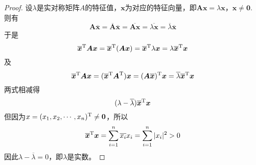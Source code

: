 \begin{proof}

    设$\lambda$是实对称矩阵$A$的特征值，$\boldsymbol{x}$为对应的特征向量，即$\boldsymbol{Ax} = \lambda \boldsymbol{x}$，$\boldsymbol{x} \neq \boldsymbol{0}$. \\
    则有
    \[\boldsymbol{A\overline{x}} = \boldsymbol{\overline{A}}\boldsymbol{\overline{x}} = \boldsymbol{\overline{Ax}} = \overline{\lambda\boldsymbol{x}} = \overline{\lambda}\boldsymbol{\overline{x}}\]
    于是
    \[\boldsymbol{\overline{x}}^{\mathrm{T}} \boldsymbol{A} \boldsymbol{x} = \boldsymbol{\overline{x}}^{\mathrm{T}} (\boldsymbol{A} \boldsymbol{x}) = \boldsymbol{\overline{x}}^{\mathrm{T}} \lambda \boldsymbol{x} = \lambda \boldsymbol{\overline{x}}^{\mathrm{T}} \boldsymbol{x}\]
    及
    \[\boldsymbol{\overline{x}}^{\mathrm{T}} \boldsymbol{A} \boldsymbol{x} = (\boldsymbol{\overline{x}}^{\mathrm{T}} \boldsymbol{A}^{\mathrm{T}}) \boldsymbol{x} = (\boldsymbol{A} \boldsymbol{\overline{x}})^{\mathrm{T}} \boldsymbol{x} = \overline{\lambda} \boldsymbol{\overline{x}}^{\mathrm{T}} \boldsymbol{x}\]
    两式相减得
    \[(\lambda - \overline{\lambda}) \boldsymbol{\overline{x}}^{\mathrm{T}} \boldsymbol{x}\]
    但因为$x = (x_1, x_2, \cdots , x_n)^{\mathrm{T}}  \neq \boldsymbol{0}$，所以
    \[\boldsymbol{\overline{x}}^{\mathrm{T}} \boldsymbol{x} = \sum\limits_{i = 1}^{n}{\overline{x_i}x_i} = \sum\limits_{i = 1}^{n}{|x_i|^2} > 0\]
    因此$\lambda - \overline{\lambda} = 0$，即$\lambda$是实数。

\end{proof}

